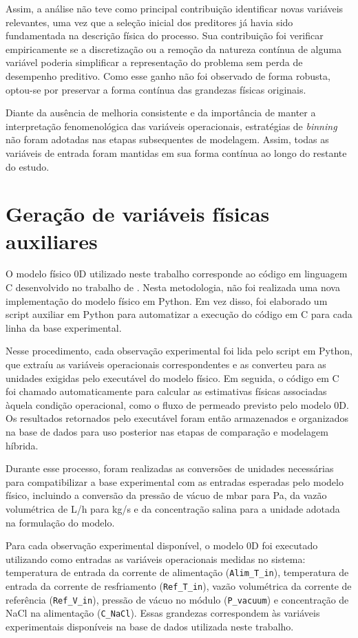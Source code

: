 Assim, a análise não teve como principal contribuição identificar novas variáveis relevantes, uma vez que a seleção inicial dos preditores já havia sido fundamentada na descrição física do processo. Sua contribuição foi verificar empiricamente se a discretização ou a remoção da natureza contínua de alguma variável poderia simplificar a representação do problema sem perda de desempenho preditivo. Como esse ganho não foi observado de forma robusta, optou-se por preservar a forma contínua das grandezas físicas originais.

Diante da ausência de melhoria consistente e da importância de manter a interpretação fenomenológica das variáveis operacionais, estratégias de \textit{binning} não foram adotadas nas etapas subsequentes de modelagem. Assim, todas as variáveis de entrada foram mantidas em sua forma contínua ao longo do restante do estudo.

\section{Geração de variáveis físicas auxiliares}
\label{subsec:geracao_variaveis_phy}

O modelo físico 0D utilizado neste trabalho corresponde ao código em linguagem C desenvolvido no trabalho de \cite{Lisboa2024}. Nesta metodologia, não foi realizada uma nova implementação do modelo físico em Python. Em vez disso, foi elaborado um script auxiliar em Python para automatizar a execução do código em C para cada linha da base experimental.

Nesse procedimento, cada observação experimental foi lida pelo script em Python, que extraíu as variáveis operacionais correspondentes e as converteu para as unidades exigidas pelo executável do modelo físico. Em seguida, o código em C foi chamado automaticamente para calcular as estimativas físicas associadas àquela condição operacional, como o fluxo de permeado previsto pelo modelo 0D. Os resultados retornados pelo executável foram então armazenados e organizados na base de dados para uso posterior nas etapas de comparação e modelagem híbrida.

Durante esse processo, foram realizadas as conversões de unidades necessárias para compatibilizar a base experimental com as entradas esperadas pelo modelo físico, incluindo a conversão da pressão de vácuo de mbar para Pa, da vazão volumétrica de L/h para kg/s e da concentração salina para a unidade adotada na formulação do modelo.

Para cada observação experimental disponível, o modelo 0D foi executado utilizando como entradas as variáveis operacionais medidas no sistema: temperatura de entrada da corrente de alimentação (\texttt{Alim\_T\_in}), temperatura de entrada da corrente de resfriamento (\texttt{Ref\_T\_in}), vazão volumétrica da corrente de referência (\texttt{Ref\_V\_in}), pressão de vácuo no módulo (\texttt{P\_vacuum}) e concentração de NaCl na alimentação (\texttt{C\_NaCl}). Essas grandezas correspondem às variáveis experimentais disponíveis na base de dados utilizada neste trabalho.

